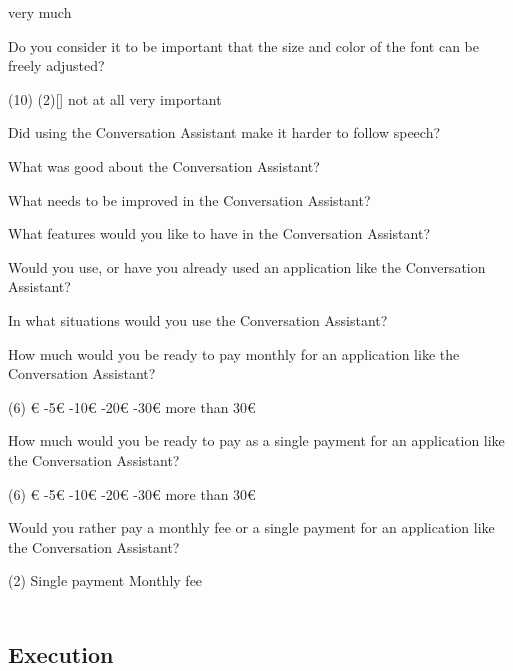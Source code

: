 \documentclass[english, 12pt, a4paper, pdftex, elec, utf8]{aaltothesis}
\begin{document}
{\begin{questionnaire}[resume]
\begin{tasks}[]
			\task[] very much
		\end{tasks}
		\item Do you consider it to be important that the size and color of the font can be freely adjusted?
		\begin{tasks}[](10)
			\task*(2)[] not at all
			\task[] very important
		\end{tasks}
		\item Did using the Conversation Assistant make it harder to follow speech?
		\item What was good about the Conversation Assistant?
		\item What needs to be improved in the Conversation Assistant?
		\item What features would you like to have in the Conversation Assistant?
		\item Would you use, or have you already used an application like the Conversation Assistant?
		\item In what situations would you use the Conversation Assistant?
		\item How much would you be ready to pay monthly for an application like the Conversation Assistant?
		\begin{tasks}[label-width = 2em](6)
			€
			-5€
			-10€
			-20€
			-30€
			\task more than 30€
		\end{tasks}
		\item How much would you be ready to pay as a single payment for an application like the Conversation Assistant?
		\begin{tasks}[label-width = 2em](6)
			\task 0€
			\task 1-5€
			\task 5-10€
			\task 10-20€
			\task 20-30€
			\task more than 30€
		\end{tasks}
		\item Would you rather pay a monthly fee or a single payment for an application like the Conversation Assistant?
		\begin{tasks}[label-width = 2em](2)
			\task Single payment
			\task Monthly fee \\\\
		\end{tasks}
	\end{questionnaire}
}

\subsection{Execution}
\end{document}
